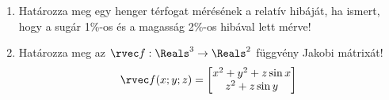 \documentclass[a4paper, 12pt, fleqn]{scrartcl}
\begin{document}
\begin{enumerate}
  \item Határozza meg egy henger térfogat mérésének a relatív hibáját, ha
        ismert, hogy a sugár 1\%-os és a magasság 2\%-os hibával lett mérve!

  \item Határozza meg az $\rvec f: \Reals^3 \to \Reals^2$ függvény Jakobi
        mátrixát!
        \begin{equation*}
          \rvec f(x;y;z)=\begin{bmatrix}
            x^2 + y^2 +z \sin x \\
            z^2 + z \sin y
          \end{bmatrix}
        \end{equation*}
\end{enumerate}
\end{document}
